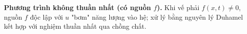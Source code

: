 \textbf{Phương trình không thuần nhất (có nguồn $f$).}
Khi vế phải $f(x,t)\neq 0$, nguồn $f$ độc lập với $u$ "bơm" năng lượng vào hệ; xử lý bằng nguyên lý Duhamel kết hợp với nghiệm thuần nhất qua chồng chất.

